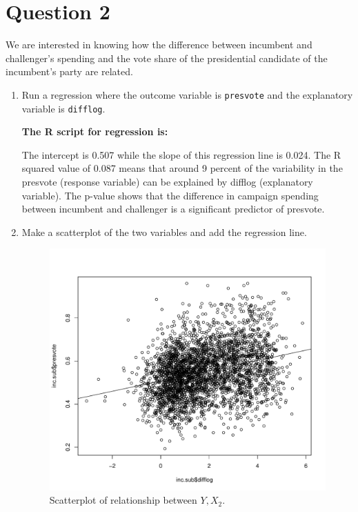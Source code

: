 \documentclass[12pt,letterpaper]{article}
\begin{document}
\section*{Question 2}
\noindent We are interested in knowing how the difference between incumbent and challenger's spending and the vote share of the presidential candidate of the incumbent's party are related.	\vspace{.25cm}
	\begin{enumerate}
		\item Run a regression where the outcome variable is \texttt{presvote} and the explanatory variable is \texttt{difflog}.
		
		
		
		\textbf{		The R script for regression is:}
		  
		
		
		The intercept is 0.507 while the slope of this regression line is 0.024. The R squared value of 0.087 means that around 9 percent of the variability in the presvote (response variable) can be explained by difflog (explanatory variable). The p-value shows that the difference in campaign spending between incumbent and challenger is a significant predictor of presvote.
		
		\item Make a scatterplot of the two variables and add the regression line. 
		
			  
		
		
		\begin{figure}[h!]\centering	\caption{\footnotesize Scatterplot of relationship between $Y, X_2$.}	
			
			\includegraphics[width=.6\textwidth]{plot2.pdf}
			
		\end{figure}
		

\end{enumerate}
\end{document}
